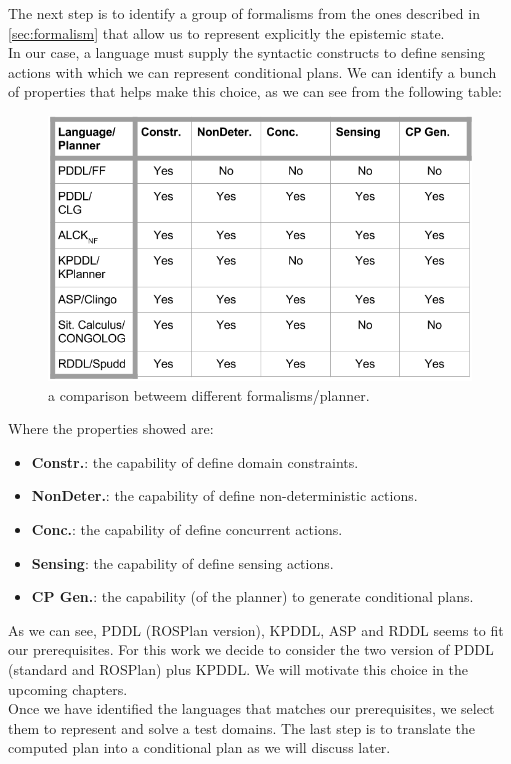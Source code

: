 \documentclass[pdftex,12pt,a4paper]{report}
\begin{document}
\noindent The next step is to identify a group of formalisms from the ones described in \ref{sec:formalism} that allow us to represent explicitly the epistemic state.\\
In our case, a language must supply the syntactic constructs to define sensing actions with which we can represent conditional plans.
We can identify a bunch of properties that helps make this choice, as we can see from the following table:
\begin{figure}[H]
	\centering
	\includegraphics[scale=0.4,trim=30mm 0mm 0mm 0mm]{images/formalisms.png}
	\caption{a comparison betweem different formalisms/planner.}
	\label{fig:formalisms}
\end{figure}
Where the properties showed are:
\begin{itemize}
\item \textbf{Constr.}: the capability of define domain constraints.
\item \textbf{NonDeter.}: the capability of define non-deterministic actions.
\item \textbf{Conc.}: the capability of define concurrent actions.
\item \textbf{Sensing}: the capability of define sensing actions.
\item \textbf{CP Gen.}: the capability (of the planner) to generate conditional plans.
\end{itemize}
\noindent As we can see, PDDL (ROSPlan version), KPDDL, ASP and RDDL seems to fit our prerequisites. For this work we decide to consider the two version of PDDL (standard and ROSPlan) plus KPDDL. We will motivate this choice in the upcoming chapters.\\
\noindent Once we have identified the languages that matches our prerequisites, we select them to represent and  solve a test domains. The last step is to translate the computed plan into a conditional plan as we will discuss later.\\
\end{document}
